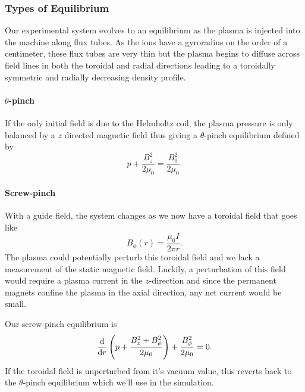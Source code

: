 \subsubsection{Types of Equilibrium}

Our experimental system evolves to an equilibrium as the plasma is injected into the machine along flux tubes. As the ions have a gyroradius on the order of a centimeter, these flux tubes are very thin but the plasma begins to diffuse across field lines in both the toroidal and radial directions leading to a toroidally symmetric and radially decreasing density profile.

\paragraph{\texorpdfstring{$\theta$}{Theta}-pinch}

If the only initial field is due to the Helmholtz coil, the plasma pressure is only balanced by a $z$ directed magnetic field thus giving a $\theta$-pinch equilibrium defined by \cite{Freidberg_2014}
\begin{equation}
    p + \frac{B_z^2}{2\mu_0} = \frac{B_0^2}{2 \mu_0}.
    \label{eq:theta_pinch_equilibrium}
\end{equation}

\paragraph{Screw-pinch}

With a guide field, the system changes as we now have a toroidal field that goes like
\begin{equation}
    B_\phi(r) = \frac{\mu_0 I}{2 \pi r}.
\end{equation}
The plasma could potentially perturb this toroidal field and we lack a measurement of the static magnetic field. Luckily, a perturbation of this field would require a plasma current in the $z$-direction and since the permanent magnets confine the plasma in the axial direction, any net current would be small.

Our screw-pinch equilibrium is \cite{Freidberg_2014}
\begin{equation}
    \dv{r} \left(p + \frac{B_z^2 + B_\phi^2}{2 \mu_0}\right) + \frac{B_\phi^2}{2 \mu_0} = 0.
    \label{eq:screw_pinch_equilibrium}
\end{equation}
If the toroidal field is unperturbed from it's vacuum value, this reverts back to the $\theta$-pinch equilibrium which we'll use in the simulation.

